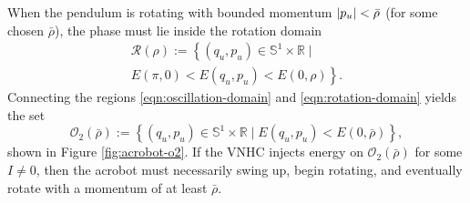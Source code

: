 \documentclass[journal,twoside,web]{ieeecolor}
\DeclarePairedDelimiter{\abs}{\lvert}{\rvert}
\newcommand*{\R}{\mathbb{R}}
\newcommand*{\Sone}{\mathbb{S}^1}
\newcommand*{\SxR}{\Sone \times \R}
\begin{document}
When the pendulum is rotating with bounded momentum
\(\abs{p_u} < \bar{\rho}\) (for some chosen \(\bar{\rho}\)),
the phase must lie inside the rotation domain
\begin{multline}\label{eqn:rotation-domain}
    \mathcal{R}(\rho) := \left\{
        (q_u,p_u) \in \SxR \mid\right.
        \\
        \left.E(\pi,0) < E(q_u,p_u) < E(0,\rho)
    \right\}
    .
\end{multline}
Connecting the regions \eqref{eqn:oscillation-domain} and
\eqref{eqn:rotation-domain} yields the set
\begin{equation}\label{eqn:o-rhobar}
    \mathcal{O}_2(\bar{\rho}) := \left\{(q_u,p_u) \in \SxR
        \mid E(q_u,p_u) < E(0,\bar{\rho}) \right\}
    ,
\end{equation}
shown in Figure \ref{fig:acrobot-o2}.
If the VNHC injects energy on \(\mathcal{O}_2(\bar{\rho})\) for some 
\(I \neq 0\), then the acrobot must necessarily swing up, begin rotating, 
and eventually rotate with a momentum of at least \(\bar{\rho}\).
\end{document}
